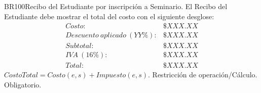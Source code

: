 \begin{BussinesRule}{BR100}{Recibo del Estudiante por inscripción a Seminario.}
	\BRitem[Descripción:] El  Recibo del Estudiante debe mostrar el total del costo con el siguiente desglose:
		\begin{displaymath}\begin{array}{lr}
			Costo: & \$ XXX.XX\\
			Descuento~aplicado~(YY\%): & \$ XXX.XX\\
			Subtotal: & \$ XXX.XX\\
			IVA~(16\%): & \$ XXX.XX\\\hline
			Total: & \$ XXX.XX
		\end{array}\end{displaymath}
	\BRitem[Sentencia:] $CostoTotal = Costo(e, s) + Impuesto(e, s)$.
	\BRitem[Tipo:] Restricción de operación/Cálculo.
	\BRitem[Nivel:] Obligatorio.
\end{BussinesRule}




